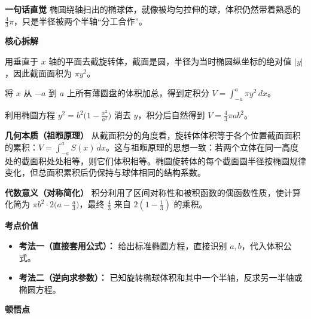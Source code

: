 \begin{explanationbox}
	\textbf{\textcolor{CExplanation}{一句话直觉}}
	椭圆绕轴扫出的椭球体，就像被均匀拉伸的球，体积仍然带着熟悉的 \(\frac{4}{3}\pi\)，只是半径被两个半轴“分工合作”。

	\medskip
	\textbf{\textcolor{CExplanation}{核心拆解}}
	\begin{description}[style=nextline, leftmargin=2.8em, labelsep=0.5em, itemsep=0.45em]
		\item[\textbf{要点一（截面圆盘）：}] 用垂直于 \(x\) 轴的平面去截旋转体，截面是圆，半径为当时椭圆纵坐标的绝对值 \(|y|\)，因此截面面积为 \(\pi y^{2}\)。
		\item[\textbf{要点二（积分累加）：}] 将 \(x\) 从 \(-a\) 到 \(a\) 上所有薄圆盘的体积加总，得到定积分 \(V=\int_{-a}^{a} \pi y^{2}\,dx\)。
		\item[\textbf{要点三（代数化简）：}] 利用椭圆方程 \(y^{2}=b^{2}\bigl(1-\frac{x^{2}}{a^{2}}\bigr)\) 消去 \(y\)，积分后自然得到 \(V=\frac{4}{3}\pi a b^{2}\)。
	\end{description}

	\medskip
	\textbf{\textcolor{CExplanation}{几何本质（祖暅原理）}}
	从截面积分的角度看，旋转体体积等于各个位置截面面积的累积：\(V = \int_{-a}^{a} S(x)\,dx\)。这与祖暅原理的思想一致：若两个立体在同一高度处的截面积处处相等，则它们体积相等。椭圆旋转体的每个截面圆半径按椭圆规律变化，但总面积累积后仍保持与球体相同的结构系数。

	\medskip
	\textbf{\textcolor{CExplanation}{代数意义（对称简化）}}
	积分利用了区间对称性和被积函数的偶函数性质，使计算化简为 \(\pi b^{2}\cdot 2\bigl(a-\frac{a}{3}\bigr)\)，最终 \(\frac{4}{3}\) 来自 \(2(1-\frac{1}{3})\) 的乘积。

	\medskip
	\textbf{\textcolor{CExplanation}{考点价值}}
	\begin{itemize}[leftmargin=*, itemsep=0.5em, topsep=0.4em]
		\item \textbf{考法一（直接套用公式）：} 给出标准椭圆方程，直接识别 \(a,b\)，代入体积公式。
		\item \textbf{考法二（逆向求参数）：} 已知旋转椭球体积和其中一个半轴，反求另一半轴或椭圆方程。
	\end{itemize}

	\medskip
	\textbf{\textcolor{CExplanation}{顿悟点}}


\end{explanationbox}
